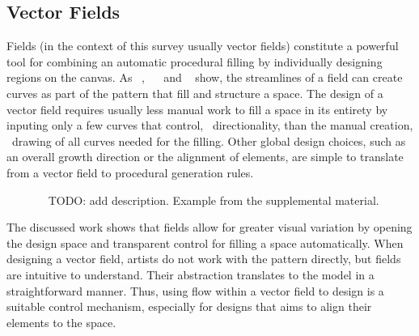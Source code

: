 \subsection{Vector Fields}
\label{subsubsec:analysis_creative_means_fields}

Fields (in the context of this survey usually vector fields) constitute a powerful tool for combining an automatic procedural filling by individually designing regions on the canvas. As \citeauthor*{hsu_2020_aef}~\cite{hsu_2020_aef}, ~\citeauthor*{saputra_2017_ffo}~\cite{saputra_2017_ffo} and \citeauthor*{gieseke_2017_ooo}~\cite{gieseke_2017_ooo} show, the streamlines of a field can create curves as part of the pattern that fill and structure a space. The design of a vector field requires usually less manual work to fill a space in its entirety by inputing only a few curves that control, \eg~directionality, than the manual creation, \eg~drawing of all curves needed for the filling. Other global design choices, such as an overall growth direction or the alignment of elements, are simple to translate from a vector field to procedural generation rules.

\begin{figure}[H]
    \centering
    \label{fig:gieseke_2017_ooo}
    \caption{\citeauthor*{gieseke_2017_ooo}~\cite{gieseke_2017_ooo} TODO: add description. Example from the supplemental material. \color{orange}{Status rights: ACM requested}}
\end{figure}

The discussed work shows that fields allow for greater visual variation by opening the design space and transparent control for filling a space automatically. When designing a vector field, artists do not work with the pattern directly, but fields are intuitive to understand. Their abstraction translates to the model in a straightforward manner. Thus, using flow within a vector field to design is a suitable control mechanism, especially for designs that aims to align their elements to the space.

